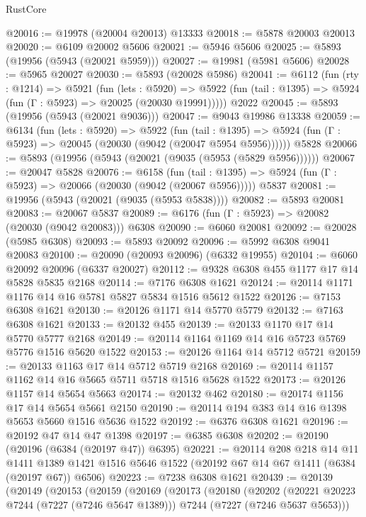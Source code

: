 \begin{lexlean}{RustCore}
\begin{coremodule}
@20016 := @19978 (@20004 @20013) @13333
@20018 := @5878 @20003 @20013
@20020 := @6109 @20002 @5606
@20021 := @5946 @5606
@20025 := @5893 (@19956 (@5943 (@20021 @5959)))
@20027 := @19981 (@5981 @5606)
@20028 := @5965 @20027
@20030 := @5893 (@20028 @5986)
@20041 := @6112
    (fun (rty : @1214) =>
    @5921
      (fun (lets : @5920) =>
      @5922 (fun (tail : @1395) => @5924 (fun (Γ : @5923) => @20025 (@20030 @19991)))))
    @2022
@20045 := @5893 (@19956 (@5943 (@20021 @9036)))
@20047 := @9043 @19986 @13338
@20059 := @6134
    (fun (lets : @5920) =>
    @5922
      (fun (tail : @1395) =>
      @5924 (fun (Γ : @5923) => @20045 (@20030 (@9042 (@20047 @5954 @5956))))))
    @5828
@20066 := @5893 (@19956 (@5943 (@20021 (@9035 (@5953 (@5829 @5956))))))
@20067 := @20047 @5828
@20076 := @6158
    (fun (tail : @1395) => @5924 (fun (Γ : @5923) => @20066 (@20030 (@9042 (@20067 @5956)))))
    @5837
@20081 := @19956 (@5943 (@20021 (@9035 (@5953 @5838))))
@20082 := @5893 @20081
@20083 := @20067 @5837
@20089 := @6176 (fun (Γ : @5923) => @20082 (@20030 (@9042 @20083))) @6308
@20090 := @6060 @20081
@20092 := @20028 (@5985 @6308)
@20093 := @5893 @20092
@20096 := @5992 @6308 @9041 @20083
@20100 := @20090 (@20093 @20096) (@6332 @19955)
@20104 := @6060 @20092 @20096 (@6337 @20027)
@20112 := @9328 @6308 @455 @1177 @17 @14 @5828 @5835 @2168
@20114 := @7176 @6308 @1621
@20124 := @20114 @1171 @1176 @14 @16 @5781 @5827 @5834 @1516 @5612 @1522
@20126 := @7153 @6308 @1621
@20130 := @20126 @1171 @14 @5770 @5779
@20132 := @7163 @6308 @1621
@20133 := @20132 @455
@20139 := @20133 @1170 @17 @14 @5770 @5777 @2168
@20149 := @20114 @1164 @1169 @14 @16 @5723 @5769 @5776 @1516 @5620 @1522
@20153 := @20126 @1164 @14 @5712 @5721
@20159 := @20133 @1163 @17 @14 @5712 @5719 @2168
@20169 := @20114 @1157 @1162 @14 @16 @5665 @5711 @5718 @1516 @5628 @1522
@20173 := @20126 @1157 @14 @5654 @5663
@20174 := @20132 @462
@20180 := @20174 @1156 @17 @14 @5654 @5661 @2150
@20190 := @20114 @194 @383 @14 @16 @1398 @5653 @5660 @1516 @5636 @1522
@20192 := @6376 @6308 @1621
@20196 := @20192 @47 @14 @47 @1398
@20197 := @6385 @6308
@20202 := @20190 (@20196 (@6384 (@20197 @47)) @6395)
@20221 := @20114
    @208
    @218
    @14
    @11
    @1411
    @1389
    @1421
    @1516
    @5646
    @1522
    (@20192 @67 @14 @67 @1411 (@6384 (@20197 @67)) @6506)
@20223 := @7238 @6308 @1621
@20439 := @20139
    (@20149
      (@20153
        (@20159
          (@20169
            (@20173
              (@20180
                (@20202
                  (@20221 @20223 @7244 (@7227 (@7246 @5647 @1389)))
                  @7244
                  (@7227 (@7246 @5637 @5653)))

\end{coremodule}
\end{lexlean}
